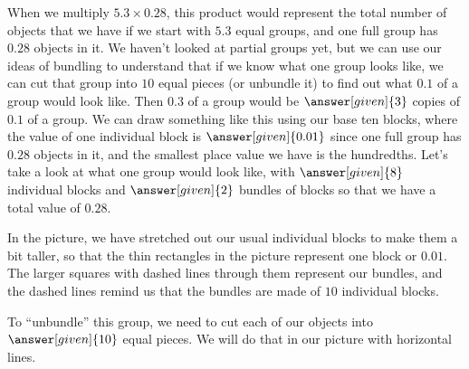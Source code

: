 \documentclass{ximera}
\begin{document}
\begin{explanation}
When we multiply $5.3 \times 0.28$, this product would represent the total number of objects that we have if we start with $5.3$ equal groups, and one full group has $0.28$ objects in it. We haven't looked at partial groups yet, but we can use our ideas of bundling to understand that if we know what one group looks like, we can cut that group into $10$ equal pieces (or unbundle it) to find out what $0.1$ of a group would look like. Then $0.3$ of a group would be $\answer[given]{3}$ copies of $0.1$ of a group. We can draw something like this using our base ten blocks, where the value of one individual block is $\answer[given]{0.01}$ since one full group has $0.28$ objects in it, and the smallest place value we have is the hundredths. Let's take a look at what one group would look like, with $\answer[given]{8}$ individual blocks and $\answer[given]{2}$ bundles of blocks so that we have a total value of $0.28$.
\begin{image}
\end{image}
In the picture, we have stretched out our usual individual blocks to make them a bit taller, so that the thin rectangles in the picture represent one block or $0.01$. The larger squares with dashed lines through them represent our bundles, and the dashed lines remind us that the bundles are made of $10$ individual blocks. 

To ``unbundle'' this group, we need to cut each of our objects into $\answer[given]{10}$ equal pieces. We will do that in our picture with horizontal lines.

\begin{image}
\end{image}


\end{explanation}
\end{document}
